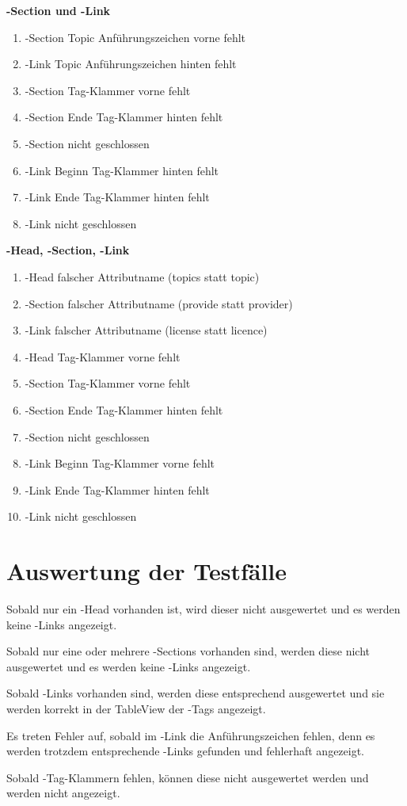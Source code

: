 \textbf{\SEARCH-Section und \SEARCH-Link} 
\begin{enumerate}
\item \SEARCH-Section Topic Anführungszeichen vorne fehlt
\item \SEARCH-Link Topic Anführungszeichen hinten fehlt
\item \SEARCH-Section Tag-Klammer vorne fehlt
\item \SEARCH-Section Ende  Tag-Klammer hinten fehlt
\item \SEARCH-Section nicht geschlossen
\item \SEARCH-Link Beginn Tag-Klammer hinten fehlt
\item \SEARCH-Link Ende  Tag-Klammer hinten fehlt
\item \SEARCH-Link nicht geschlossen
\end{enumerate}

\textbf{\SEARCH-Head, \SEARCH-Section, \SEARCH-Link}

\begin{enumerate}
\item \SEARCH-Head falscher Attributname (topics statt topic)
\item \SEARCH-Section falscher Attributname (provide statt provider)
\item \SEARCH-Link falscher Attributname (license statt licence)
\item \SEARCH-Head Tag-Klammer vorne fehlt
\item \SEARCH-Section Tag-Klammer vorne fehlt
\item \SEARCH-Section Ende  Tag-Klammer hinten fehlt
\item \SEARCH-Section nicht geschlossen
\item \SEARCH-Link Beginn Tag-Klammer vorne fehlt
\item \SEARCH-Link Ende  Tag-Klammer hinten fehlt
\item \SEARCH-Link nicht geschlossen
\end{enumerate}

\section{Auswertung der Testfälle}

Sobald nur ein \SEARCH-Head vorhanden ist, wird dieser nicht ausgewertet und es werden keine \SEARCH-Links angezeigt.

Sobald nur eine oder mehrere \SEARCH-Sections vorhanden sind, werden diese nicht ausgewertet und es werden keine \SEARCH-Links angezeigt.

Sobald \SEARCH-Links vorhanden sind, werden diese entsprechend ausgewertet und sie werden korrekt in der TableView der \SEARCH-Tags angezeigt.

Es treten Fehler auf, sobald im \SEARCH-Link die Anführungszeichen fehlen, denn es werden trotzdem entsprechende \SEARCH-Links gefunden und fehlerhaft angezeigt.

Sobald \SEARCH-Tag-Klammern fehlen, können diese nicht ausgewertet werden und werden nicht angezeigt.